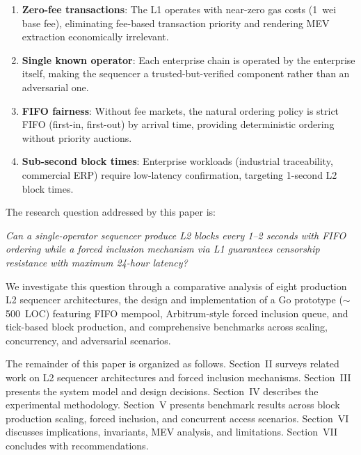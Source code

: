 \begin{enumerate}
  \item \textbf{Zero-fee transactions}: The L1 operates with near-zero gas costs
    (1~wei base fee), eliminating fee-based transaction priority and rendering
    MEV extraction economically irrelevant.
  \item \textbf{Single known operator}: Each enterprise chain is operated by the
    enterprise itself, making the sequencer a trusted-but-verified component
    rather than an adversarial one.
  \item \textbf{FIFO fairness}: Without fee markets, the natural ordering policy
    is strict FIFO (first-in, first-out) by arrival time, providing deterministic
    ordering without priority auctions.
  \item \textbf{Sub-second block times}: Enterprise workloads (industrial
    traceability, commercial ERP) require low-latency confirmation, targeting
    1-second L2 block times.
\end{enumerate}

The research question addressed by this paper is:

\medskip
\noindent\textit{Can a single-operator sequencer produce L2 blocks every 1--2 seconds
with FIFO ordering while a forced inclusion mechanism via L1 guarantees censorship
resistance with maximum 24-hour latency?}
\medskip

We investigate this question through a comparative analysis of eight production L2
sequencer architectures, the design and implementation of a Go prototype
(${\sim}$500~LOC) featuring FIFO mempool, Arbitrum-style forced inclusion queue, and
tick-based block production, and comprehensive benchmarks across scaling, concurrency,
and adversarial scenarios.

The remainder of this paper is organized as follows. Section~II surveys related work
on L2 sequencer architectures and forced inclusion mechanisms. Section~III presents the
system model and design decisions. Section~IV describes the experimental methodology.
Section~V presents benchmark results across block production scaling, forced inclusion,
and concurrent access scenarios. Section~VI discusses implications, invariants, MEV
analysis, and limitations. Section~VII concludes with recommendations.
